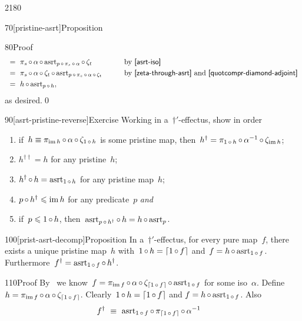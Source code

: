 \begin{parsec}{2180}
\begin{point}{70}[pristine-asrt]{Proposition}
\begin{point}{80}{Proof}
\begin{alignat*}{2}
   & \ =\  \pi_s \after \alpha \after \asrt_{p\after\pi_s \after \alpha} \after \zeta_t 
   &\qquad&\text{by \sref{asrt-iso}}\\
   & \ =\  \pi_s \after \alpha \after \zeta_t \after \asrt_{p\after\pi_s \after \alpha \after \zeta_t} 
    &\qquad& \text{by \sref{zeta-through-asrt}
                    and \sref{quotcompr-diamond-adjoint} }\\
   & \ = \ h \after \asrt_{p \after h},
\end{alignat*}
as desired.\qed
\end{point}
\end{point}
\begin{point}{90}[asrt-pristine-reverse]{Exercise}%
Working in a~$\dagger'$-effectus, show in order
\begin{enumerate}
    \item if~$h \equiv \pi_{\operatorname{im} h} \mathop{\circ} \alpha \mathop{\circ} \zeta_{1 \mathop{\circ} h}$
            is some pristine map,
            then~$h^\dagger = \pi_{1 \mathop{\circ} h} \mathop{\circ} \alpha^{-1} \mathop{\circ} \zeta_{\operatorname{im} h}$;
    \item $h^{\dagger\dagger} = h$ for any pristine~$h$;
    \item $h^\dagger \mathop{\circ} h = \mathrm{asrt}_{1 \mathop{\circ} h}$ for any pristine map~$h$;
    \item $p \mathop{\circ} h^\dagger \leqslant \operatorname{im} h$ for any predicate~$p$ \emph{and}
    \item
        if~$p \leqslant 1 \mathop{\circ} h$,
        then~$\mathrm{asrt}_{p\mathop{\circ} h^\dagger} \mathop{\circ} h = h \mathop{\circ} \mathrm{asrt}_p$.
\end{enumerate}
\end{point}
\spacingfix{}
\begin{point}{100}[prist-asrt-decomp]{Proposition}%
In a~$\dagger'$-effectus,
        for every pure map~$f$,
    there exists a unique pristine map~$h$
    with~$1 \mathop{\circ} h = \left\lceil1 \mathop{\circ} f\right\rceil$
    and~$f = h \mathop{\circ} \mathrm{asrt}_{1 \mathop{\circ} f}$.
    Furthermore~$f^\dagger = \mathrm{asrt}_{1 \mathop{\circ} f}\mathop{\circ} h^\dagger$.
\begin{point}{110}{Proof}%
By~
 we know~$f = \pi_{\operatorname{im} f} \mathop{\circ} \alpha \mathop{\circ} \zeta_{\left\lceil1 \mathop{\circ} f\right\rceil}
        \mathop{\circ} \mathrm{asrt}_{1 \mathop{\circ} f}$
        for some iso~$\alpha$.
Define~$h = \pi_{\operatorname{im} f} \mathop{\circ} \alpha \mathop{\circ} \zeta_{\left\lceil1 \mathop{\circ} f\right\rceil}$.
Clearly~$1 \mathop{\circ} h = \left\lceil1 \mathop{\circ} f\right\rceil$
    and $f = h \mathop{\circ} \mathrm{asrt}_{1 \mathop{\circ} f}$.
    Also
    \begin{alignat*}{2}
        f^\dagger &\ \equiv\ 
        \asrt_{1 \after f}
            \after \pi_{\ceil{1 \after f}}
            \after \alpha^{-1}

\end{alignat*}
\end{point}
\end{point}
\end{parsec}
